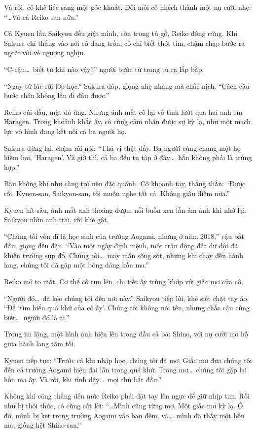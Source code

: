 \documentclass[../main.tex]{subfiles}
\begin{document}
Và rồi, cô khẽ liếc sang một góc khuất. Đôi môi cô nhếch thành một nụ cười nhẹ: ``\dots Và cả Reiko-san nữa.''

Cả Kyuen lẫn Saikyou đều giật mình, còn trong tủ gỗ, Reiko đông cứng. Khi Sakura chỉ thẳng vào nơi cô đang trốn, cô chỉ biết thót tim, chậm chạp bước ra ngoài với vẻ ngượng nghịu.

``C-cậu\dots\ biết từ khi nào vậy?'' người bước từ trong tủ ra lắp bắp.

``Ngay từ lúc rời lớp học.'' Sakura đáp, giọng nhẹ nhàng mà chắc nịch. ``Cách cậu bước chân không lẫn đi đâu được.''

Reiko cúi đầu, mặt đỏ ửng. Nhưng ánh mắt cô lại vô tình lướt qua hai anh em Haragen. Trong khoảnh khắc ấy, cô cũng cảm nhận được sự kỳ lạ, như một mạch lực vô hình đang kết nối cả ba người họ.

Sakura dừng lại, chậm rãi nói: ``Thú vị thật đấy. Ba người cùng chung một họ hiếm hoi, `Haragen'. Và giờ thì, cả ba đều tụ tập ở đây\dots\ hẳn không phải là trùng hợp.''

Bầu không khí như càng trở nên đặc quánh. Cô khoanh tay, thẳng thắn: ``Được rồi. Kyuen-san, Saikyou-san, tôi muốn nghe tất cả. Không giấu diếm nữa.''

Kyuen hít sâu, ánh mắt anh thoáng đượm nỗi buồn xen lẫn ám ảnh khi nhớ lại. Saikyou nhìn anh trai, rồi khẽ gật.

``Chúng tôi vốn dĩ là học sinh của trường Aogami, nhưng ở năm 2018,'' cậu bắt đầu, giọng đều đặn. ``Vào một ngày định mệnh, một trận động đất dữ dội đã khiến trường sụp đổ. Chúng tôi\dots\ may mắn sống sót, nhưng khi chạy đến hành lang, chúng tôi đã gặp một bóng dáng hồn ma.''

Reiko mở to mắt. Cơ thể cô run lên, chi tiết ấy trùng khớp với giấc mơ của cô.

``Người đó\dots\ đã kéo chúng tôi đến nơi này.'' Saikyou tiếp lời, khẽ siết chặt tay áo. ``Để `tìm hiểu quá khứ của cô ấy'. Chúng tôi không nói tên, nhưng chắc cậu cũng biết\dots\ người đó là ai.''

Trong im lặng, một hình ảnh hiện lên trong đầu cả ba: Shino, với nụ cười mơ hồ giữa hành lang tăm tối.

Kyuen tiếp tục: ``Trước cả khi nhập học, chúng tôi đã mơ. Giấc mơ đưa chúng tôi đến cả trường Aogami hiện đại lẫn trong quá khứ. Trong mơ\dots\ chúng tôi gặp lại hồn ma ấy. Và rồi, khi tỉnh dậy\dots\ mọi thứ bắt đầu.''

Không khí căng thẳng đến mức Reiko phải đặt tay lên ngực để giữ nhịp tim. Rồi như bị thôi thúc, cô cũng cất lời: ``\dots Mình cũng từng mơ. Một giấc mơ kỳ lạ. Ở đó, mình bị kẹt trong trường Aogami vào ban đêm, và\dots\ mình đã thấy một hồn ma, giống hệt Shino-san.''
\end{document}
